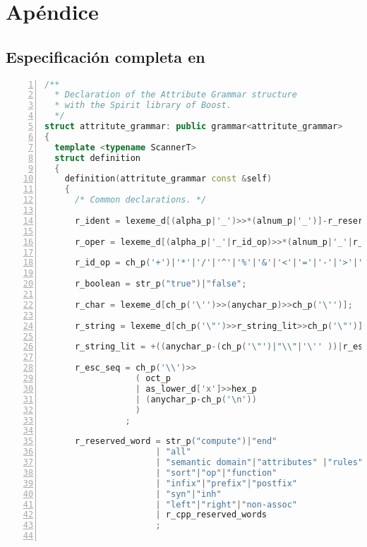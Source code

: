 \chapter{Apéndice}
\label{chap:appendix}

\section{Especificación completa en \spirit}
\label{append:grammarspirit}

\begin{center}\begin{lstlisting}[numbers=left,basicstyle=\tiny,language=C++]
/**
  * Declaration of the Attribute Grammar structure
  * with the Spirit library of Boost.
  */
struct attritute_grammar: public grammar<attritute_grammar>
{
  template <typename ScannerT>
  struct definition
  {
    definition(attritute_grammar const &self)
    {
      /* Common declarations. */

      r_ident = lexeme_d[(alpha_p|'_')>>*(alnum_p|'_')]-r_reserved_word;

      r_oper = lexeme_d[(alpha_p|'_'|r_id_op)>>*(alnum_p|'_'|r_id_op)];

      r_id_op = ch_p('+')|'*'|'/'|'^'|'%'|'&'|'<'|'='|'-'|'>'|'|'|'~'|'.'|','|'?';

      r_boolean = str_p("true")|"false";

      r_char = lexeme_d[ch_p('\'')>>(anychar_p)>>ch_p('\'')];

      r_string = lexeme_d[ch_p('\"')>>r_string_lit>>ch_p('\"')];

      r_string_lit = +((anychar_p-(ch_p('\"')|"\\"|'\'' ))|r_esc_seq);

      r_esc_seq = ch_p('\\')>>
                  ( oct_p
                  | as_lower_d['x']>>hex_p
                  | (anychar_p-ch_p('\n'))
                  )
                ;

      r_reserved_word = str_p("compute")|"end"
                      | "all"
                      | "semantic domain"|"attributes" |"rules"
                      | "sort"|"op"|"function"
                      | "infix"|"prefix"|"postfix"
                      | "syn"|"inh"
                      | "left"|"right"|"non-assoc"
                      | r_cpp_reserved_words
                      ;


\end{lstlisting}
\end{center}
